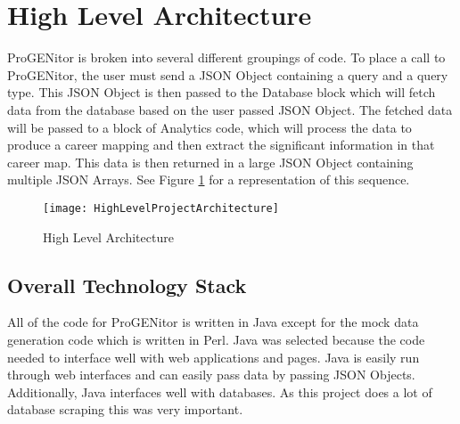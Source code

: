 \section{High Level Architecture}
\label{sect:high-level-architecture}
ProGENitor is broken into several different groupings of code.  To place a call
to ProGENitor, the user must send a JSON Object containing a query and a query
type.  This JSON Object is then passed to the Database block which will fetch
data from the database based on the user passed JSON Object.  The fetched data
will be passed to a block of Analytics code, which will process the data to
produce a career mapping and then extract the significant information in that
career map.  This data is then returned in a large JSON Object containing multiple JSON
Arrays. See Figure
\ref{fig:HighLevelProjectArchitecture}
for a representation of this sequence.

\begin{figure}[H]
  \centering
  \texttt{[image: HighLevelProjectArchitecture]}
  \caption{High Level Architecture}
  \label{fig:HighLevelProjectArchitecture}
\end{figure}

\subsection{Overall Technology Stack}
All of the code for ProGENitor is written in Java except for the mock data
generation code which is written in Perl.  Java was selected because the code
needed to interface well with web applications and pages.  Java is easily run through
web interfaces and can easily pass data by passing JSON Objects.  Additionally,
Java interfaces well with databases.  As this project does a lot of database
scraping this was very important.
